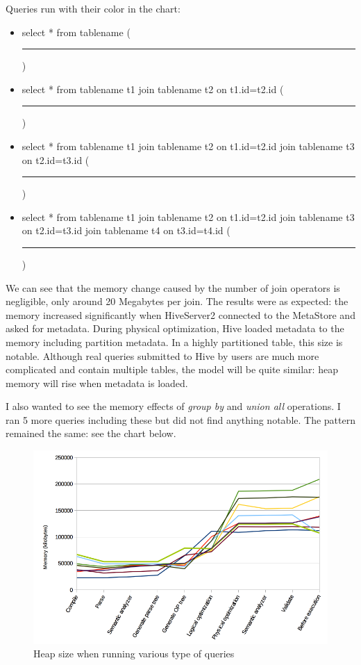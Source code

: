\noindent Queries run with their color in the chart:
\begin{itemize}
	\item select * from tablename (\textcolor{blue}{\rule{2 cm}{2pt} })
	\item select * from tablename t1 join tablename t2 on t1.id=t2.id (\textcolor{orange}{\rule{2 cm}{2pt} })
	\item select * from tablename t1 join tablename t2 on t1.id=t2.id join tablename t3 on t2.id=t3.id (\textcolor{yellow}{\rule{2 cm}{2pt} })
	\item select * from tablename t1 join tablename t2 on t1.id=t2.id join tablename t3 on t2.id=t3.id join tablename t4 on t3.id=t4.id (\textcolor{green}{\rule{2 cm}{2pt} })
\end{itemize}

We can see that the memory change caused by the number of join operators is negligible, only around 20 Megabytes per join. The results were as expected: the memory increased significantly when HiveServer2 connected to the MetaStore and asked for metadata. During physical optimization, Hive loaded metadata to the memory including partition metadata. In a highly partitioned table, this size is notable. Although real queries submitted to Hive by users are much more complicated and contain multiple tables, the model will be quite similar: heap memory will rise when metadata is loaded.

I also wanted to see the memory effects of \textit{group by} and  \textit{union all} operations. I ran 5 more queries including these but did not find anything notable. The pattern remained the same: see the chart below. 

\begin{figure}[H]
	\includegraphics[width=150mm, keepaspectratio]{figures/hs2_memory.png}
	\centering
	\caption{Heap size when running various type of queries}
\end{figure}

